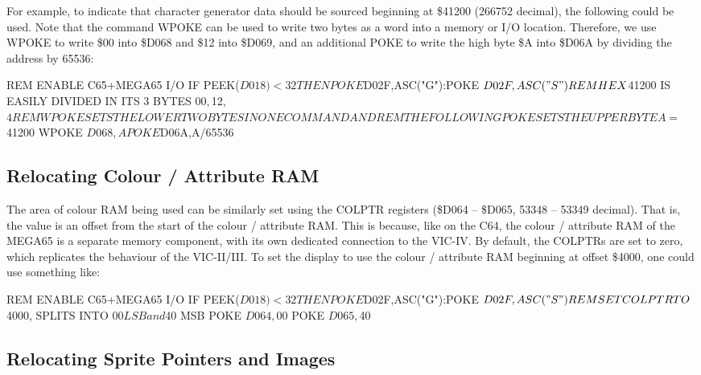 For example, to indicate that character generator data should be sourced beginning at \$41200 (266752 decimal), the following
could be used.  Note that the command WPOKE can be used to write two bytes as a word into a memory or I/O location. Therefore, we use WPOKE to write \$00 into \$D068 and \$12 into \$D069, and an additional POKE to write the high byte \$A into \$D06A by dividing the address by 65536:

\begin{screenoutput}
REM ENABLE C65+MEGA65 I/O
IF PEEK($D018)<32 THEN POKE $D02F,ASC("G"):POKE $D02F,ASC("S")
REM HEX $41200 IS EASILY DIVIDED IN ITS 3 BYTES $00, $12, $4
REM WPOKE SETS THE LOWER TWO BYTES IN ONE COMMAND AND
REM THE FOLLOWING POKE SETS THE UPPER BYTE
A=$41200
WPOKE $D068,A
POKE $D06A,A/65536
\end{screenoutput}

\subsection{Relocating Colour / Attribute RAM}

The area of colour RAM being used can be similarly set using the COLPTR registers (\$D064 -- \$D065, 53348 -- 53349 decimal). That is, the value is an offset from the start of the colour / attribute RAM.  This is because, like on the C64, the colour / attribute RAM of the MEGA65 is a separate memory component, with its own dedicated connection to the VIC-IV.  By default, the COLPTRs are set to zero, which replicates the behaviour of the VIC-II/III.  To set the display to use the colour / attribute RAM beginning at offset \$4000, one could use something like:

\begin{screenoutput}
REM ENABLE C65+MEGA65 I/O
IF PEEK($D018)<32 THEN POKE $D02F,ASC("G"):POKE $D02F,ASC("S")
REM SET COLPTR TO $4000, SPLITS INTO $00 LSB and $40 MSB
POKE $D064,$00
POKE $D065,$40
\end{screenoutput}

\subsection{Relocating Sprite Pointers and Images}

